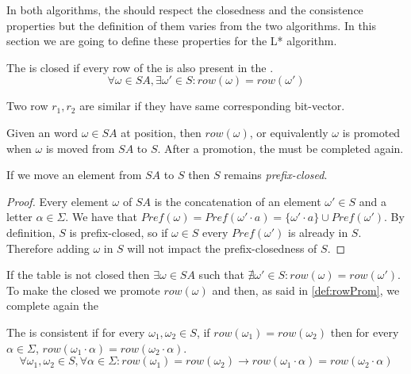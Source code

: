 In both algorithms, the \OT should respect the closedness and the consistence properties but the definition of them varies from the two algorithms. In this section we are going to define these properties for the L* algorithm.

\begin{definition}[Closedness]
  The \OT is closed if every row of the \lowerPart is also present in the \upperPart.
  \[\forall \omega \in SA, \exists \omega' \in S : row(\omega) = row(\omega')\]
\end{definition}

\begin{definition} Two row $r_1, r_2$ are similar if they have same corresponding bit-vector.
\end{definition}

\begin{definition}
  \label{def:rowProm}
  Given an word $\omega \in SA$ at position, then $row(\omega)$, or equivalently $\omega$ is promoted when $\omega$ is moved from $SA$ to $S$. After a promotion, the \OT must be completed again.
\end{definition}

\begin{lemma}
  \label{lemmaPromoteLinePrefixClosedness}
  If we move an element from $SA$ to $S$ then $S$ remains \textit{prefix-closed}.
\end{lemma}

\begin{proof}
  Every element $\omega$ of $SA$ is the concatenation of an element $\omega' \in S$ and a letter $\alpha \in \Sigma$. We have that $Pref(\omega) = Pref(\omega' \cdot a) = \{\omega' \cdot a\} \cup Pref(\omega')$. By definition, $S$ is prefix-closed, so if $\omega \in S$ every $Pref(\omega')$ is already in $S$. Therefore adding $\omega$ in $S$ will not impact the prefix-closedness of $S$.
\end{proof}

If the table is not closed then $\exists \omega \in SA$ such that $\nexists \omega' \in S : row(\omega) = row(\omega')$. To make the \OT closed we promote $row(\omega)$ and then, as said in \cref{def:rowProm}, we complete again the \OT

\begin{definition}[Consistence]
  The \OT is consistent if for every $\omega_1,\omega_2 \in S$, if $row(\omega_1) = row(\omega_2)$ then for every $\alpha \in \Sigma$, $row(\omega_1 \cdot \alpha) = row(\omega_2 \cdot \alpha)$.
  \[\forall \omega_1,\omega_2 \in S, \forall \alpha \in \Sigma :  row(\omega_1) = row(\omega_2) \rightarrow row(\omega_1 \cdot \alpha) = row(\omega_2 \cdot \alpha)\]
\end{definition}

